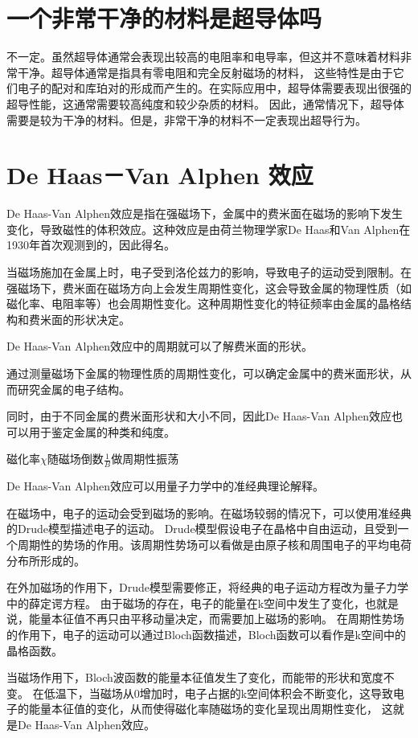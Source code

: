 \documentclass[12pt, a4paper, oneside]{ctexart}
\begin{document}
\begin{spacing}{2.0}
\section{一个非常干净的材料是超导体吗}
不一定。虽然超导体通常会表现出较高的电阻率和电导率，但这并不意味着材料非常干净。超导体通常是指具有零电阻和完全反射磁场的材料，
这些特性是由于它们电子的配对和库珀对的形成而产生的。在实际应用中，超导体需要表现出很强的超导性能，这通常需要较高纯度和较少杂质的材料。
因此，通常情况下，超导体需要是较为干净的材料。但是，非常干净的材料不一定表现出超导行为。
\section{De Haas－Van Alphen 效应}
De Haas-Van Alphen效应是指在强磁场下，金属中的费米面在磁场的影响下发生变化，导致磁性的体积效应。这种效应是由荷兰物理学家De Haas和Van Alphen在1930年首次观测到的，因此得名。

当磁场施加在金属上时，电子受到洛伦兹力的影响，导致电子的运动受到限制。在强磁场下，费米面在磁场方向上会发生周期性变化，这会导致金属的物理性质（如磁化率、电阻率等）也会周期性变化。这种周期性变化的特征频率由金属的晶格结构和费米面的形状决定。

De Haas-Van Alphen效应中的周期就可以了解费米面的形状。

通过测量磁场下金属的物理性质的周期性变化，可以确定金属中的费米面形状，从而研究金属的电子结构。

同时，由于不同金属的费米面形状和大小不同，因此De Haas-Van Alphen效应也可以用于鉴定金属的种类和纯度。

磁化率$\chi$随磁场倒数$\frac{1}{B}$做周期性振荡

De Haas-Van Alphen效应可以用量子力学中的准经典理论解释。

在磁场中，电子的运动会受到磁场的影响。在磁场较弱的情况下，可以使用准经典的Drude模型描述电子的运动。
Drude模型假设电子在晶格中自由运动，且受到一个周期性的势场的作用。该周期性势场可以看做是由原子核和周围电子的平均电荷分布所形成的。

在外加磁场的作用下，Drude模型需要修正，将经典的电子运动方程改为量子力学中的薛定谔方程。
由于磁场的存在，电子的能量在k空间中发生了变化，也就是说，能量本征值不再只由平移动量决定，而需要加上磁场的影响。
在周期性势场的作用下，电子的运动可以通过Bloch函数描述，Bloch函数可以看作是k空间中的晶格函数。

当磁场作用下，Bloch波函数的能量本征值发生了变化，而能带的形状和宽度不变。
在低温下，当磁场从0增加时，电子占据的k空间体积会不断变化，这导致电子的能量本征值的变化，从而使得磁化率随磁场的变化呈现出周期性变化，
这就是De Haas-Van Alphen效应。


\end{spacing}
\end{document}
